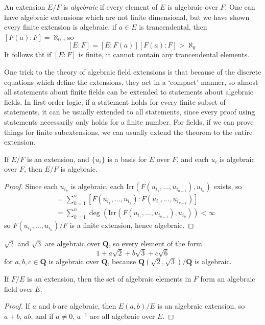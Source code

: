 An extension $E/F$ is {\it algebraic} if every element of $E$ is algebraic over $F$. One can have algebraic extensions which are not finite dimensional, but we have shown every finite extension is algebraic. if $a \in E$ is trancendental, then $[F(a): F] = \aleph_0$, so
%
\[ [E:F] = [E:F(a)][F(a):F] > \aleph_0 \]
%
It follows tht if $[E:F]$ is finite, it cannot contain any trancendental elements.

One trick to the theory of algebraic field extensions is that because of the discrete equations which define the extensions, they act in a `compact' manner, so almost all statements about finite fields can be extended to statements about algebraic fields. In first order logic, if a statement holds for every finite subset of statements, it can be usually extended to all statements, since every proof using statements necessarily only holds for a finite number. For fields, if we can prove things for finite subextensions, we can usually extend the theorem to the entire extension.

\begin{theorem}
    If $E/F$ is an extension, and $\{ u_i \}$ is a basis for $E$ over $F$, and each $u_i$ is algebraic over $F$, then $E/F$ is algebraic.
\end{theorem}
\begin{proof}
	Since each $u_{i_k}$ is algebraic, each $\text{Irr}(F(u_{i_1}, \dots, u_{i_{n-1}}), u_{i_n})$ exists, so
    \begin{align*}
        [F(u_{i_1}, \dots, u_{i_n}): F] &= \sum_{k = 1}^n \left[F(u_{i_1}, \dots, u_{i_k}): F(u_{i_1}, \dots, u_{i_{k-1}})\right]\\
        &= \sum_{k = 1}^n \deg\left(\text{Irr}\left(F(u_{i_1}, \dots, u_{i_{k-1}}), u_{i_k} \right) \right) < \infty
    \end{align*}
    so $F(u_{i_1}, \dots, u_{i_n})/F$ is a finite extension, hence algebraic.
\end{proof}

\begin{example}
    $\sqrt{2}$ and $\sqrt{3}$ are algebraic over $\mathbf{Q}$, so every element of the form
    \[ 1 + a \sqrt{2} + b \sqrt{3} + c \sqrt{6} \]
    for $a,b,c \in \mathbf{Q}$ is algebraic over $\mathbf{Q}$, because $\mathbf{Q}(\sqrt{2},\sqrt{3})/\mathbf{Q}$ is algebraic.
\end{example}

\begin{theorem}
    If $F/E$ is an extension, then the set of algebraic elements in $F$ form an algebraic field over $E$.
\end{theorem}
\begin{proof}
    If $a$ and $b$ are algebraic, then $E(a,b)/E$ is an algebraic extension, so $a + b$, $ab$, and if $a \neq 0$, $a^{-1}$ are all algebraic over $E$.
\end{proof}

